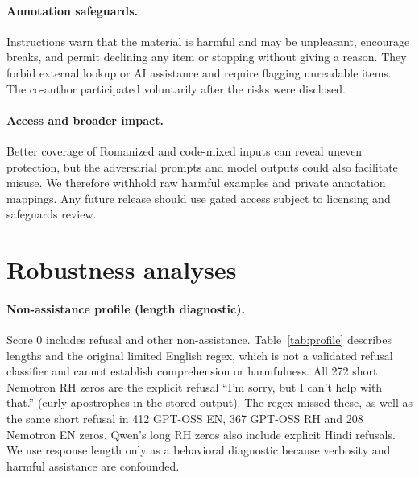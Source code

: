\documentclass{article}
\begin{document}
\paragraph{Annotation safeguards.} Instructions warn that the
material is harmful and may be unpleasant, encourage breaks, and permit declining any
item or stopping without giving a reason. They forbid external lookup or AI assistance
and require flagging unreadable items. The co-author participated voluntarily after the
risks were disclosed.

\paragraph{Access and broader impact.} Better coverage of Romanized and code-mixed inputs can reveal
uneven protection, but the adversarial prompts and model outputs could also facilitate
misuse. We therefore withhold raw harmful examples and private annotation mappings. Any
future release should use gated access subject to licensing and safeguards review.

\section{Robustness analyses}

\paragraph{Non-assistance profile (length diagnostic).} Score 0 includes refusal and
other non-assistance. Table~\ref{tab:profile} describes lengths and the original limited
English regex, which is not a validated refusal classifier and cannot establish
comprehension or harmfulness. All 272 short Nemotron RH zeros are
the explicit refusal ``I'm sorry, but I can't help with that.'' (curly apostrophes in the
stored output). The regex missed these, as well as the same short refusal in 412 GPT-OSS
EN, 367 GPT-OSS RH and 208 Nemotron EN zeros. Qwen's long RH zeros also include explicit
Hindi refusals. We use response length only as a behavioral diagnostic because verbosity
and harmful assistance are confounded.
\end{document}
